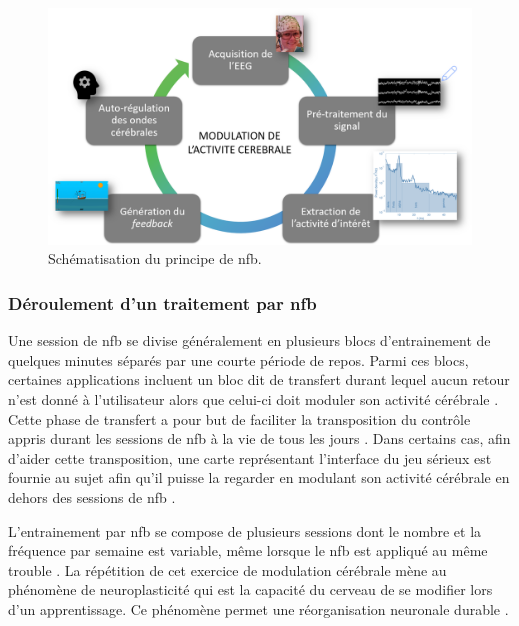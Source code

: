 \begin{figure}[h!]
  \centering
	\includegraphics[width=1\linewidth]{figures/chapter-1/introduction-nfb-explication} 
  \caption[Schématisation du principe de \gls{nfb}.]{Schématisation du principe de \gls{nfb}.}
  \label{Figure:introduction_nfb_explications}
\end{figure}

\subsubsection{Déroulement d'un traitement par \gls{nfb}}

Une session de \gls{nfb} se divise généralement en plusieurs blocs d'entrainement de quelques minutes séparés par une courte période de repos.
Parmi ces blocs, certaines applications incluent 
un bloc dit de transfert durant lequel aucun retour n'est donné à l'utilisateur alors que celui-ci doit moduler son activité cérébrale \citep{Bioulac2019,
Bluschke2016, Gani2008, Strehl2006}. Cette phase de transfert a pour but de faciliter la transposition du contrôle appris durant les 
sessions de \gls{nfb} à la vie de tous les jours \citep{Arns2014}. Dans certains cas, afin d'aider cette transposition, une carte représentant l'interface du jeu sérieux est 
fournie au sujet afin qu'il puisse la regarder en modulant son activité cérébrale en dehors des sessions de \gls{nfb} \citep{Leins2007}.

L'entrainement par \gls{nfb} se compose de plusieurs sessions dont le nombre et la fréquence par semaine est variable, même lorsque le \gls{nfb} est appliqué au même trouble 
\citep{Enriquez2017}. La répétition de cet exercice de modulation cérébrale mène au phénomène de 
neuroplasticité \citep{VanDoren2017, Ros2010} qui est la capacité du cerveau de se modifier lors d'un apprentissage. Ce phénomène 
permet une réorganisation neuronale durable \citep{VanDoren2017}. 


